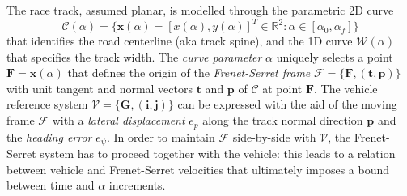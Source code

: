 \documentclass[conference]{IEEEtran} %
\renewcommand{\vec}[1]{\boldsymbol{#1}}
\DeclarePairedDelimiter{\norm}{\lVert}{\rVert}
\begin{document}
The race track, assumed planar, is modelled through the parametric 2D curve
\begin{equation}
\mathcal C(\alpha) = \{ \vec x (\alpha) = [x(\alpha), y(\alpha)]^T \in \mathbb{R}^2 : \alpha \in [\alpha_0, \alpha_f] \}
\end{equation}
%
that identifies the road centerline (aka track spine), and the 1D curve $\mathcal W(\alpha)$ that specifies the track width.
The \emph{curve parameter} $\alpha$ uniquely selects a point $\vec F = \vec x(\alpha)$ that defines the origin of the \emph{Frenet-Serret frame} $\mathcal F = \{ \vec F, (\vec t, \vec p) \}$ with unit tangent and normal vectors $\vec t$ and $\vec p$ of $\mathcal C$ at point $\vec F$.
%
The vehicle reference system $\mathcal V = \{ \vec G, (\vec i, \vec j) \}$ can be expressed with the aid of the moving frame $\mathcal F$ with a \emph{lateral displacement} $e_p$ along the track normal direction $\vec p$ and the \emph{heading error} $e_\psi$.
In order to maintain $\mathcal F$ side-by-side with $\mathcal V$, the Frenet-Serret system has to proceed together with the vehicle: this leads to a relation between vehicle and Frenet-Serret velocities that ultimately imposes a bound between time and $\alpha$ increments.

%
\end{document}
